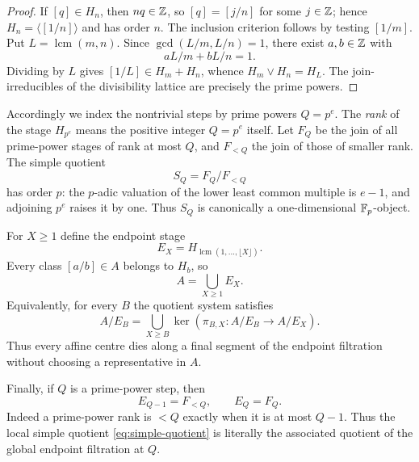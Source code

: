 \begin{proof}
If $[q]\in H_n$, then $nq\in\mathbb Z$, so $[q]=[j/n]$ for some $j\in\mathbb Z$; hence $H_n=\langle[1/n]\rangle$ and has order $n$.  The inclusion criterion follows by testing $[1/m]$.  Put $L=\operatorname{lcm}(m,n)$.  Since $\gcd(L/m,L/n)=1$, there exist $a,b\in\mathbb Z$ with
\[
aL/m+bL/n=1.
\]
Dividing by $L$ gives $[1/L]\in H_m+H_n$, whence $H_m\vee H_n=H_L$.  The join-irreducibles of the divisibility lattice are precisely the prime powers.
\end{proof}

Accordingly we index the nontrivial steps by prime powers $Q=p^e$.  The \emph{rank} of the stage $H_{p^e}$ means the positive integer $Q=p^e$ itself.  Let $F_Q$ be the join of all prime-power stages of rank at most $Q$, and $F_{<Q}$ the join of those of smaller rank.  The simple quotient
\begin{equation}\label{eq:simple-quotient}
S_Q=F_Q/F_{<Q}
\end{equation}
has order $p$: the $p$-adic valuation of the lower least common multiple is $e-1$, and adjoining $p^e$ raises it by one.  Thus $S_Q$ is canonically a one-dimensional $\mathbb F_p$-object.

For $X\ge1$ define the endpoint stage
\begin{equation}\label{eq:endpoint-stage}
E_X=H_{\operatorname{lcm}(1,\ldots,\lfloor X\rfloor)}.
\end{equation}
Every class $[a/b]\in A$ belongs to $H_b$, so
\begin{equation}\label{eq:cofinal-union}
A=\bigcup_{X\ge1}E_X.
\end{equation}
Equivalently, for every $B$ the quotient system satisfies
\begin{equation}\label{eq:centre-kernel-union}
A/E_B
=
\bigcup_{X\ge B}\ker\!\left(\pi_{B,X}:A/E_B\to A/E_X\right).
\end{equation}
Thus every affine centre dies along a final segment of the endpoint filtration without choosing a representative in $A$.

Finally, if $Q$ is a prime-power step, then
\begin{equation}\label{eq:endpoint-current-step}
E_{Q-1}=F_{<Q},
\qquad
E_Q=F_Q.
\end{equation}
Indeed a prime-power rank is $<Q$ exactly when it is at most $Q-1$.  Thus the local simple quotient \eqref{eq:simple-quotient} is literally the associated quotient of the global endpoint filtration at $Q$.
